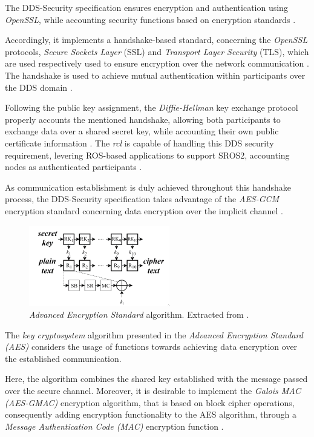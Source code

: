 The DDS-Security specification ensures encryption and authentication using \textit{OpenSSL}, while accounting security functions based on encryption standards \cite{takemoto2019performance}. 

Accordingly, it implements a handshake-based standard, concerning the \textit{OpenSSL} protocols, \textit{Secure Sockets Layer} (SSL) and \textit{Transport Layer Security} (TLS), which are used respectively used to ensure encryption over the network communication \cite{white2016sros, kim2018security}. The handshake is used to achieve mutual authentication within participants over the DDS domain \cite{white2019network}.

Following the public key assignment, the \textit{Diffie-Hellman} key exchange protocol properly accounts the mentioned handshake, allowing both participants to exchange data over a shared secret key, while accounting their own public certificate information \cite{kim2018security}. The \textit{rcl} is capable of handling this DDS security requirement, levering ROS-based applications to support SROS2, accounting nodes as authenticated participants \cite{white2016sros}. 

As communication establishment is duly achieved throughout this handshake process, the DDS-Security specification takes advantage of the \textit{AES-GCM} encryption standard concerning data encryption over the implicit channel \cite{kim2018security, takemoto2019performance}.

\begin{figure}[H]
    \centering
    \includegraphics[width=0.4\linewidth]{images/ros_aes.png}
    \caption{\textit{Advanced Encryption Standard} algorithm. Extracted from \cite{takemoto2019performance}.}
    \label{fig:ros_aes}
\end{figure}

The \textit{key cryptosystem} algorithm \cite{takemoto2019performance} presented in the \textit{Advanced Encryption Standard (AES)} considers the usage of functions towards achieving data encryption over the established communication. 

Here, the algorithm combines the shared key established with the message passed over the secure channel. Moreover, it is desirable to implement the \textit{Galois MAC (AES-GMAC)} encryption algorithm, that is based on block cipher operations, consequently adding encryption functionality to the AES algorithm, through a \textit{Message Authentication Code (MAC)} encryption function \cite{takemoto2019performance, kim2018security}.


